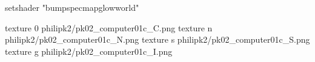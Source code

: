 setshader "bumpspecmapglowworld"


texture 0 philipk2/pk02_computer01c_C.png
texture n philipk2/pk02_computer01c_N.png
texture s philipk2/pk02_computer01c_S.png
texture g philipk2/pk02_computer01c_I.png

